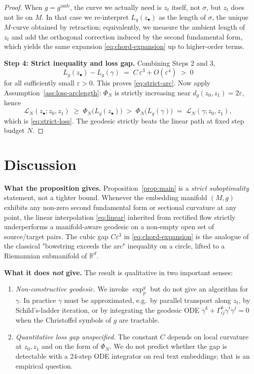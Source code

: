 \documentclass[11pt]{article}
\begin{document}
\begin{proof}
When $g = g^{\mathrm{amb}}$, the curve we actually need is $z_t$
itself, not $\sigma$, but $z_t$ does not lie on $M$. In that case we
re-interpret $L_g(z_\bullet)$ as the length of $\sigma$, the unique
$M$-curve obtained by retraction; equivalently, we measure the
ambient length of $z_t$ and add the orthogonal correction induced by
the second fundamental form, which yields the same expansion
\eqref{eq:chord-expansion} up to higher-order terms.

\medskip
\noindent\textbf{Step 4: Strict inequality and loss gap.}
Combining Steps 2 and 3,
\[
  L_g(z_\bullet) - L_g(\gamma)
  \;=\; C\,\varepsilon^{3} + O(\varepsilon^{4}) \;>\; 0
\]
for all sufficiently small $\varepsilon > 0$. This proves
\eqref{eq:strict-arc}. Now apply
Assumption~\ref{ass:loss-arclength}: $\Phi_N$ is strictly increasing
near $d_g(z_0,z_1) = 2\varepsilon$, hence
\[
  \mathcal{L}_N(z_\bullet; z_0,z_1)
  \;\ge\; \Phi_N\bigl(L_g(z_\bullet)\bigr)
  \;>\; \Phi_N\bigl(L_g(\gamma)\bigr)
  \;=\; \mathcal{L}_N(\gamma; z_0,z_1),
\]
which is \eqref{eq:strict-loss}. The geodesic strictly beats the
linear path at fixed step budget $N$.
\end{proof}

\section*{Discussion}

\noindent\textbf{What the proposition gives.}
Proposition~\ref{prop:main} is a \emph{strict suboptimality}
statement, not a tighter bound. Whenever the embedding manifold
$(M,g)$ exhibits any non-zero second fundamental form or sectional
curvature at any point, the linear interpolation \eqref{eq:linear}
inherited from rectified flow strictly underperforms a manifold-aware
geodesic on a non-empty open set of source/target pairs. The cubic
gap $C\varepsilon^3$ in \eqref{eq:chord-expansion} is the analogue of
the classical "bowstring exceeds the arc" inequality on a circle, lifted
to a Riemannian submanifold of $\mathbb{R}^d$.

\medskip
\noindent\textbf{What it does \emph{not} give.}
The result is qualitative in two important senses:
\begin{enumerate}
  \item \emph{Non-constructive geodesic.} We invoke $\exp_p^g$ but do
        not give an algorithm for $\gamma$. In practice $\gamma$ must
        be approximated, e.g.\ by parallel transport along $z_t$,
        by Schild's-ladder iteration, or by integrating the geodesic
        ODE $\ddot\gamma^k + \Gamma^k_{ij}\dot\gamma^i\dot\gamma^j = 0$
        when the Christoffel symbols of $g$ are tractable.
  \item \emph{Quantitative loss gap unspecified.} The constant $C$
        depends on local curvature at $z_0, z_1$ and on the form of
        $\Phi_N$. We do not predict whether the gap is detectable
        with a 24-step ODE integrator on real text embeddings; that
        is an empirical question.
\end{enumerate}
\end{document}
